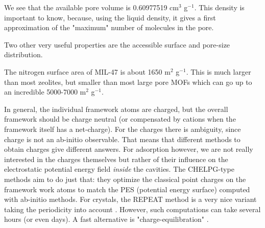 We see that the available pore volume is 0.60977519 cm$^3$ g$^{-1}$. This density is important to know, because, using the liquid density,
it gives a first approximation of the "maximum" number of molecules in the pore.

Two other very useful properties are the accessible surface and pore-size distribution.
\begin{center}
\end{center}

The nitrogen surface area of MIL-47 is about 1650 m$^2$ g$^{-1}$. This is much larger than most zeolites, but smaller than most large pore MOFs
which can go up to an incredible 5000-7000 m$^2$ g$^{-1}$.

\begin{center}
\end{center}

In general, the individual framework atoms are charged, but the overall framework should be charge neutral (or compensated by cations when the
framework itself has a net-charge).
For the charges there is ambiguity, since charge is not an ab-initio observable. That means that different methods to obtain charges
give different answers. For adsorption however, we are not really interested in the charges themselves but rather of their influence on the 
electrostatic potential energy field \emph{inside} the cavities. The CHELPG-type methods aim to do just that: they optimize the classical
point charges on the framework work atoms to match the PES (potential energy surface) computed with ab-initio methods.
For crystals, the REPEAT method is a very nice variant taking the periodicity into account \cite{Campana2009}. However, such
computations can take several hours (or even days). A fast alternative is "charge-equilibration" \cite{Rappe1991,Wilmer2011b,Wilmer2012}.

\begin{center}
\end{center}

